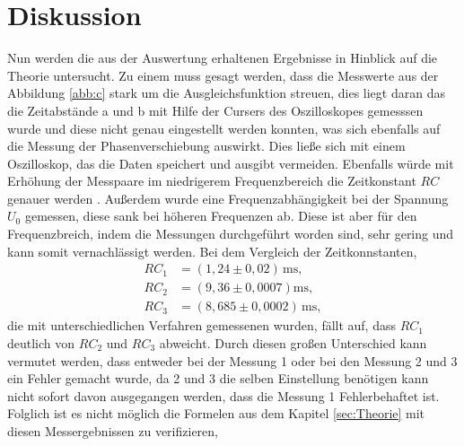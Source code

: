 \section{Diskussion}
\label{sec:Diskussion}
Nun werden die aus der Auswertung erhaltenen
Ergebnisse in Hinblick auf die Theorie untersucht.
Zu einem muss gesagt werden, dass die Messwerte aus der Abbildung \ref{abb:c} stark
um die Ausgleichsfunktion streuen, dies liegt daran das die Zeitabstände a und b mit
Hilfe der Cursers des Oszilloskopes gemesssen wurde und diese nicht genau eingestellt werden konnten,
was sich ebenfalls auf die Messung der Phasenverschiebung auswirkt.
Dies ließe sich mit einem Oszilloskop, das die Daten speichert und ausgibt vermeiden.
Ebenfalls würde mit Erhöhung der Messpaare im niedrigerem Frequenzbereich die Zeitkonstant $RC$ genauer werden .
Außerdem wurde eine Frequenzabhängigkeit bei der Spannung $U_0$ gemessen, diese sank bei höheren Frequenzen ab.
Diese ist aber für den Frequenzbreich, indem die Messungen durchgeführt
worden sind, sehr gering und kann somit vernachlässigt werden.
Bei dem Vergleich der Zeitkonnstanten,
\begin{align*}
  RC_\mathrm{1}&=(1,24\pm0,02)\,\si{\milli\second},\\
  RC_\mathrm{2}&=(9,36 \pm 0,0007)\si{\milli\second},\\
  RC_\mathrm{3}&=(8,685\pm0,0002)\,\si{\milli\second},
\end{align*}
die mit unterschiedlichen Verfahren gemessenen wurden, fällt auf, dass
 $RC_\mathrm{1}$ deutlich von $RC_\mathrm{2}$ und $RC_\mathrm{3}$ abweicht. Durch diesen großen Unterschied
 kann vermutet werden, dass entweder bei der Messung 1  oder bei den Messung 2 und 3 ein Fehler gemacht wurde, da 2 und 3 die selben Einstellung
 benötigen kann nicht sofort davon ausgegangen werden, dass die Messung 1 Fehlerbehaftet ist.
 Folglich ist es nicht möglich die Formelen  aus dem Kapitel \ref{sec:Theorie} mit diesen Messergebnissen zu verifizieren,
